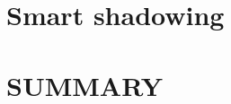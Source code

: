 \documentclass[driverfallback=dvipdfmx,final]{pittetd}
\begin{document}
\chapter{Smart shadowing}
\label{chapter:smart}


%

\chapter{SUMMARY}
\label{chapter:summary}


\appendix                      
%

\begin{singlespace}

{
\footnotesize

}
\end{singlespace}
\end{document}

